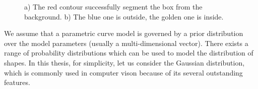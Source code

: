 \begin{figure}[htbp]
  \centering
    \begin{minipage}[t]{0.5\linewidth} 
    \centering 
  \end{minipage}%
  \begin{minipage}[t]{0.5\linewidth} 
    \centering 
  \end{minipage} 
  \caption[A contour divide an image into two parts]{a) The red
    contour successfully segment the box from the background. b) The
    blue one is outside, the golden one is inside.}
  \label{fig:divide}
\end{figure}


We assume that a parametric curve model is governed by a prior distribution
over the model parameters (usually a multi-dimensional vector). There
exists a range of probability distributions which can be used to model
the distribution of shapes. In this thesis, for simplicity, let us
consider the Gaussian distribution, which is commonly used in computer
vison because of its several outstanding features. 



